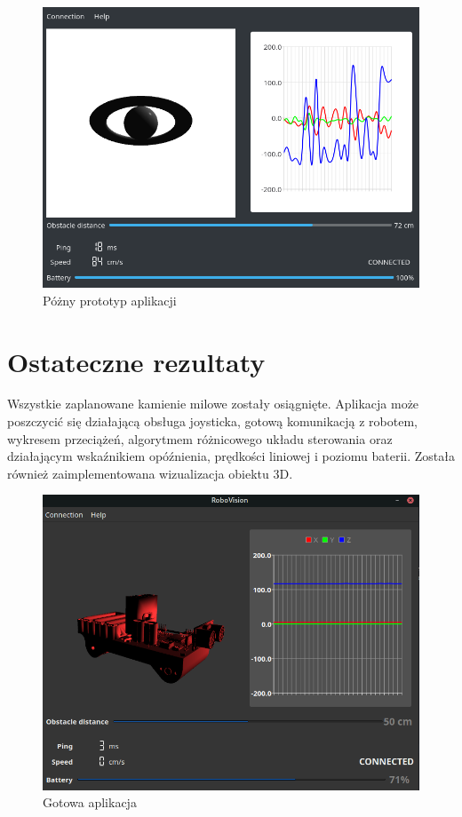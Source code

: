 \documentclass[12pt,a4paper,polish]{article}
\begin{document}
  \begin{figure}[ht]
    \centering
    \includegraphics[width=1\textwidth]{img/app.png}
    \caption{Póżny prototyp aplikacji}
    \label{fig:interfejs}
  \end{figure}
  
  \newpage
  \section{Ostateczne rezultaty}
  Wszystkie zaplanowane kamienie milowe zostały osiągnięte. Aplikacja może 
  poszczycić się działającą obsługa joysticka, gotową komunikacją z robotem,
  wykresem przeciążeń, algorytmem różnicowego układu sterowania oraz działającym
  wskaźnikiem opóźnienia, prędkości liniowej i poziomu baterii. 
  Została również zaimplementowana wizualizacja obiektu 3D. 

  \begin{figure}[ht]
    \centering
    \includegraphics[width=1\textwidth]{img/final/app.png}
    \caption{Gotowa aplikacja}
    \label{fig:interfejs}
  \end{figure}
\end{document}
